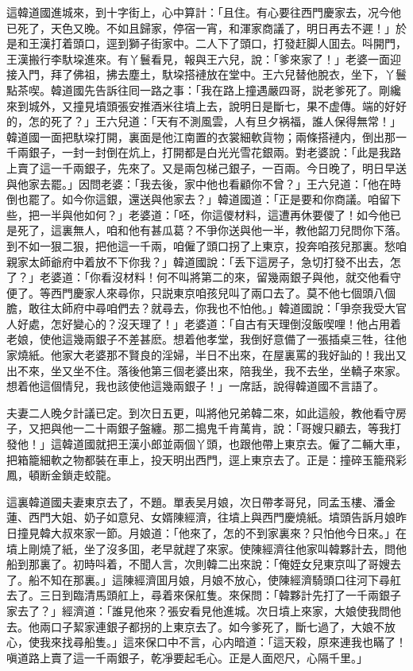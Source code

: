 這韓道國進城來，到十字街上，心中算計：「且住。有心要往西門慶家去，况今他已死了，天色又晚。不如且歸家，停宿一宵，和渾家商議了，明日再去不遲！」於是和王漢打着頭口，逕到獅子街家中。二人下了頭口，打發赶脚人囬去。呌開門，王漢搬行李馱垜進來。有丫鬟看見，報與王六兒，說：「爹來家了！」老婆一面迎接入門，拜了佛祖，拂去塵土，馱垜搭褳放在堂中。王六兒替他脫衣，坐下，丫鬟點茶喫。韓道國先告訴往囘一路之事：「我在路上撞遇嚴四哥，説老爹死了。剛纔來到城外，又撞見墳頭張安推酒米往墳上去，說明日是斷七，果不虚傳。端的好好的，怎的死了？」王六兒道：「天有不測風雲，人有旦夕祸福，誰人保得無常！」韓道國一面把馱垜打開，裏面是他江南置的衣裳細軟貨物；兩條搭褳内，倒出那一千兩銀子，一封一封倒在炕上，打開都是白光光雪花銀兩。對老婆說：「此是我路上賣了這一千兩銀子，先來了。又是兩包梯己銀子，一百兩。今日晚了，明日早送與他家去罷。」因問老婆：「我去後，家中他也看顧你不曾？」王六兒道：「他在時倒也罷了。如今你這銀，還送與他家去？」韓道國道：「正是要和你商議。咱留下些，把一半與他如何？」老婆道：「呸，你這儍材料，這遭再休要儍了！如今他已是死了，這裏無人，咱和他有甚瓜葛？不爭你送與他一半，教他韶刀兒問你下落。到不如一狠二狠，把他這一千兩，咱僱了頭口拐了上東京，投奔咱孩兒那裏。愁咱親家太師爺府中着放不下你我？」韓道國說：「丢下這房子，急切打發不出去，怎了？」老婆道：「你看沒材料！何不叫將第二的來，留幾兩銀子與他，就交他看守便了。等西門慶家人來尋你，只説東京咱孩兒叫了兩口去了。莫不他七個頭八個膽，敢往太師府中尋咱們去？就尋去，你我也不怕他。」韓道國說：「爭奈我受大官人好處，怎好變心的？沒天理了！」老婆道：「自古有天理倒沒飯喫哩！他占用着老娘，使他這幾兩銀子不差甚麽。想着他孝堂，我倒好意備了一張插桌三牲，往他家燒紙。他家大老婆那不賢良的淫婦，半日不出來，在屋裏罵的我好訕的！我出又出不來，坐又坐不住。落後他第三個老婆出來，陪我坐，我不去坐，坐轎子來家。想着他這個情兒，我也該使他這幾兩銀子！」一席話，說得韓道國不言語了。

夫妻二人晚夕計議已定。到次日五更，叫將他兄弟韓二來，如此這般，教他看守房子，又把與他一二十兩銀子盤纏。那二搗鬼千肯萬肯，說：「哥嫂只顧去，等我打發他！」這韓道國就把王漢小郎並兩個丫頭，也跟他帶上東京去。僱了二輛大車，把箱籠細軟之物都裝在車上，投天明出西門，逕上東京去了。正是：撞碎玉籠飛彩鳳，頓断金鎖走蛟龍。

這裏韓道國夫妻東京去了，不題。單表吴月娘，次日帶孝哥兒，同孟玉樓、潘金蓮、西門大姐、奶子如意兒、女婿陳經濟，往墳上與西門慶燒紙。墳頭告訴月娘昨日撞見韓大叔來家一節。月娘道：「他來了，怎的不到家裏來？只怕他今日來。」在墳上剛燒了紙，坐了沒多囬，老早就趕了來家。使陳經濟往他家叫韓夥計去，問他船到那裏了。初時呌着，不聞人言，次則韓二出來說：「俺姪女兒東京叫了哥嫂去了。船不知在那裏。」這陳經濟囬月娘，月娘不放心，使陳經濟騎頭口往河下尋舡去了。三日到臨清馬頭舡上，尋着來保舡隻。來保問：「韓夥計先打了一千兩銀子家去了？」經濟道：「誰見他來？張安看見他進城。次日墳上來家，大娘使我問他去。他兩口子絜家連銀子都拐的上東京去了。如今爹死了，斷七過了，大娘不放心，使我來找尋船隻。」這來保口中不言，心内暗道：「這天殺，原來連我也瞞了！嗔道路上賣了這一千兩銀子，乾凈要起毛心。正是人面咫尺，心隔千里。」

